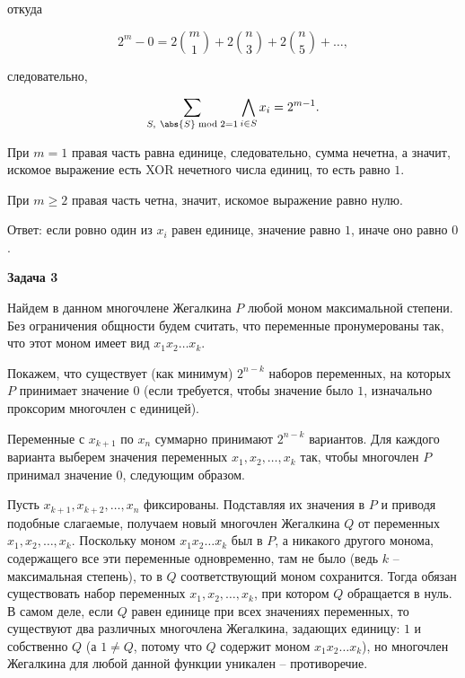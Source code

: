 		откуда

		\begin{equation*}
			2^m - 0 = 2 \binom{m}{1} + 2 \binom{n}{3} + 2 \binom{n}{5} + \dots,
		\end{equation*}

		следовательно,

		\begin{equation*}
			\sum_{S, \ \abs{S} \bmod 2 = 1} \bigwedge_{i \in S} x_i = 2^{m-1}.
		\end{equation*}

		При $m = 1$ правая часть равна единице, следовательно, сумма нечетна, а значит, искомое выражение есть XOR нечетного числа единиц, то есть равно $1$.

		При $m \ge 2$ правая часть четна, значит, искомое выражение равно нулю.

		Ответ: если ровно один из $x_i$ равен единице, значение равно $1$, иначе оно равно $0$.


	\begin{center}
    \textbf{Задача 3}
\end{center}
		Найдем в данном многочлене Жегалкина $P$ любой моном максимальной степени. Без ограничения общности будем считать, что переменные пронумерованы так, что этот моном имеет вид $x_1 x_2 \dots x_k$.

		Покажем, что существует (как минимум) $2^{n-k}$ наборов переменных, на которых $P$ принимает значение $0$ (если требуется, чтобы значение было $1$, изначально проксорим многочлен с единицей).

		Переменные с $x_{k+1}$ по $x_n$ суммарно принимают $2^{n-k}$ вариантов. Для каждого варианта выберем значения переменных $x_1, x_2, \dots, x_k$ так, чтобы многочлен $P$ принимал значение $0$, следующим образом.

		Пусть $x_{k+1}, x_{k+2}, \dots, x_n$ фиксированы. Подставляя их значения в $P$ и приводя подобные слагаемые, получаем новый многочлен Жегалкина $Q$ от переменных $x_1, x_2, \dots, x_k$. Поскольку моном $x_1 x_2 \dots x_k$ был в $P$, а никакого другого монома, содержащего все эти переменные одновременно, там не было (ведь $k$ -- максимальная степень), то в $Q$ соответствующий моном сохранится. Тогда обязан существовать набор переменных $x_1, x_2, \dots, x_k$, при котором $Q$ обращается в нуль. В самом деле, если $Q$ равен единице при всех значениях переменных, то существуют два различных многочлена Жегалкина, задающих единицу: $1$ и собственно $Q$ (а $1 \ne Q$, потому что $Q$ содержит моном $x_1 x_2 \dots x_k$), но многочлен Жегалкина для любой данной функции уникален -- противоречие.


